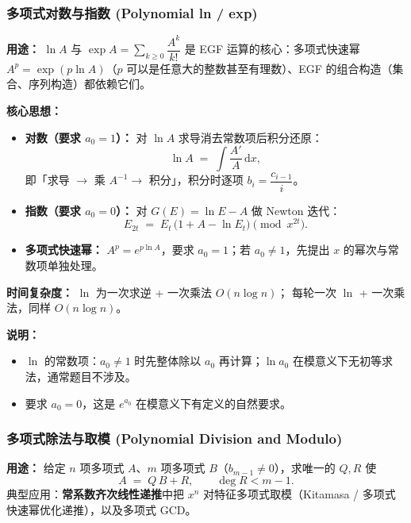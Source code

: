 

\subsubsection{多项式对数与指数 (Polynomial ln / exp)}

\textbf{用途：}  
$\ln A$ 与 $\exp A=\sum_{k\ge 0}\dfrac{A^k}{k!}$ 是 EGF 运算的核心：多项式快速幂 $A^{p}=\exp(p\ln A)$（$p$ 可以是任意大的整数甚至有理数）、EGF 的组合构造（集合、序列构造）都依赖它们。

\textbf{核心思想：}
\begin{itemize}
    \item \textbf{对数（要求 $a_0=1$）：} 对 $\ln A$ 求导消去常数项后积分还原：
    \[ \ln A \;=\; \int \frac{A'}{A}\,\mathrm{d}x, \]
    即「求导 $\to$ 乘 $A^{-1} \to$ 积分」，积分时逐项 $b_i = \dfrac{c_{i-1}}{i}$。
    \item \textbf{指数（要求 $a_0=0$）：} 对 $G(E)=\ln E - A$ 做 Newton 迭代：
    \[ E_{2t} \;=\; E_t\,\bigl(1 + A - \ln E_t\bigr) \pmod{x^{2t}}. \]
    \item \textbf{多项式快速幂：} $A^p=e^{p\ln A}$，要求 $a_0=1$；若 $a_0\ne 1$，先提出 $x$ 的幂次与常数项单独处理。
\end{itemize}

\textbf{时间复杂度：} $\ln$ 为一次求逆 + 一次乘法 $O(n\log n)$； 每轮一次 $\ln$ + 一次乘法，同样 $O(n\log n)$。



\textbf{说明：}
\begin{itemize}
    \item $\ln$ 的常数项：$a_0\ne 1$ 时先整体除以 $a_0$ 再计算；$\ln a_0$ 在模意义下无初等求法，通常题目不涉及。
    \item {} 要求 $a_0=0$，这是 $e^{a_0}$ 在模意义下有定义的自然要求。
\end{itemize}

\subsubsection{多项式除法与取模 (Polynomial Division and Modulo)}

\textbf{用途：}  
给定 $n$ 项多项式 $A$、$m$ 项多项式 $B$（$b_{m-1}\ne 0$），求唯一的 $Q,R$ 使
\[ A \;=\; Q\,B + R, \qquad \deg R < m-1. \]
典型应用：\textbf{常系数齐次线性递推}中把 $x^n$ 对特征多项式取模（Kitamasa / 多项式快速幂优化递推），以及多项式 GCD。

